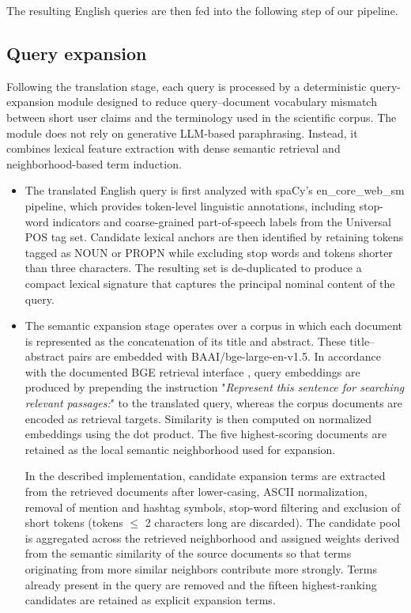 The resulting English queries are then fed into the following step of our pipeline.

\subsection{Query expansion} \label{sub:query-expansion}

Following the translation stage, each query is processed by a deterministic query-expansion module designed to reduce query–document vocabulary mismatch between short user claims and the terminology used in the scientific corpus. The module does not rely on generative LLM-based paraphrasing. Instead, it combines lexical feature extraction with dense semantic retrieval and neighborhood-based term induction. 

\begin{itemize}
    \item The translated English query is first analyzed with spaCy’s en\_core\_web\_sm pipeline, which provides token-level linguistic annotations, including stop-word indicators and coarse-grained part-of-speech labels from the Universal POS tag set. Candidate lexical anchors are then identified by retaining tokens tagged as NOUN or PROPN while excluding stop words and tokens shorter than three characters. The resulting set is de-duplicated to produce a compact lexical signature that captures the principal nominal content of the query.

    \item The semantic expansion stage operates over a corpus in which each document is represented as the concatenation of its title and abstract. These title–abstract pairs are embedded with BAAI/bge-large-en-v1.5. In accordance with the documented BGE retrieval interface \cite{bge-large-en-v1.5}, query embeddings are produced by prepending the instruction "\emph{Represent this sentence for searching relevant passages:}" to the translated query, whereas the corpus documents are encoded as retrieval targets. Similarity is then computed on normalized embeddings using the dot product.
    The five highest-scoring documents are retained as the local semantic neighborhood used for expansion.

    In the described implementation, candidate expansion terms are extracted from the retrieved documents after lower-casing, ASCII normalization, removal of mention and hashtag symbols, stop-word filtering and exclusion of short tokens (tokens $\le$ 2 characters long are discarded). The candidate pool is aggregated across the retrieved neighborhood and assigned weights derived from the semantic similarity of the source documents so that terms originating from more similar neighbors contribute more strongly. Terms already present in the query are removed and the fifteen highest-ranking candidates are retained as explicit expansion terms.
\end{itemize}

